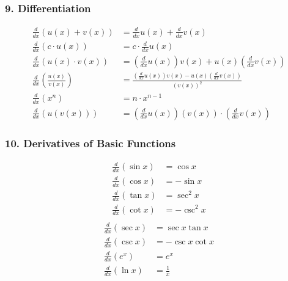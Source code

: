 \documentclass[twocolumn,a4]{article}
\begin{document}
\subsubsection*{9. Differentiation}
\begin{align*}
\frac{d}{dx}(u(x)+v(x)) &= \frac{d}{dx}u(x) + \frac{d}{dx}v(x) \\
\frac{d}{dx}(c \cdot u(x)) &= c \cdot \frac{d}{dx}u(x) \\
\frac{d}{dx}(u(x) \cdot v(x)) &= \left(\frac{d}{dx}u(x)\right)v(x) + u(x)\left(\frac{d}{dx}v(x)\right) \\
\frac{d}{dx}\left(\frac{u(x)}{v(x)}\right) &= \frac{\left(\frac{d}{dx}u(x)\right)v(x) - u(x)\left(\frac{d}{dx}v(x)\right)}{(v(x))^2} \\
\frac{d}{dx}(x^n) &= n \cdot x^{n-1} \\
\frac{d}{dx}(u(v(x))) &= \left(\frac{d}{dx}u(x)\right)(v(x)) \cdot \left(\frac{d}{dx}v(x)\right)
\end{align*}

\subsubsection*{10. Derivatives of Basic Functions}

\begin{multicols}{2}
\begin{align*}
\frac{d}{dx}(\sin x) &= \cos x \\
\frac{d}{dx}(\cos x) &= -\sin x \\
\frac{d}{dx}(\tan x) &= \sec^2 x \\
\frac{d}{dx}(\cot x) &= -\csc^2 x \\
\end{align*}
\columnbreak
\begin{align*}
\frac{d}{dx}(\sec x) &= \sec x \tan x \\
\frac{d}{dx}(\csc x) &= -\csc x \cot x \\
\frac{d}{dx}(e^x) &= e^x \\
\frac{d}{dx}(\ln x) &= \frac{1}{x}
\end{align*}
\end{multicols}
\end{document}
